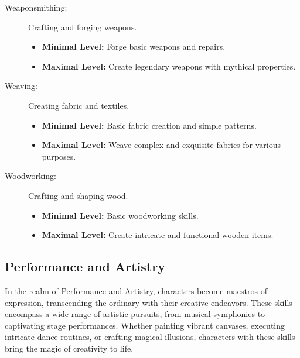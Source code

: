 \documentclass[12pt]{book}
\begin{document}
\begin{description}
    \item[Weaponsmithing:] Crafting and forging weapons.
        \begin{itemize}
            \item \textbf{Minimal Level:} Forge basic weapons and repairs.
            \item \textbf{Maximal Level:} Create legendary weapons with mythical properties.
        \end{itemize}

    \item[Weaving:] Creating fabric and textiles.
        \begin{itemize}
            \item \textbf{Minimal Level:} Basic fabric creation and simple patterns.
            \item \textbf{Maximal Level:} Weave complex and exquisite fabrics for various purposes.
        \end{itemize}

    \item[Woodworking:] Crafting and shaping wood.
        \begin{itemize}
            \item \textbf{Minimal Level:} Basic woodworking skills.
            \item \textbf{Maximal Level:} Create intricate and functional wooden items.
        \end{itemize}

\end{description}

\subsection{\textbf{Performance and Artistry}}

In the realm of Performance and Artistry, characters become maestros of expression, transcending the ordinary with their creative endeavors. These skills encompass a wide range of artistic pursuits, from musical symphonies to captivating stage performances. Whether painting vibrant canvases, executing intricate dance routines, or crafting magical illusions, characters with these skills bring the magic of creativity to life.
\end{document}
